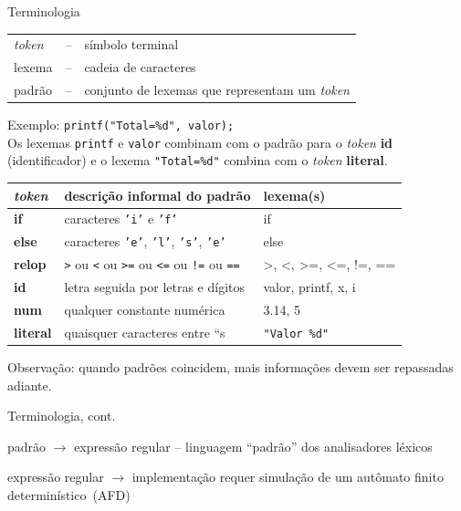 \begin{frame}{Terminologia}
  \begin{tabular}[h]{lcl}
    \alert{\it token\/}& -- & símbolo terminal\\
    lexema & -- &cadeia de caracteres \\
    padrão & -- &conjunto de lexemas que representam um {\it token\/}
  \end{tabular}\bigskip

  \pause\small
  Exemplo: {\tt printf("Total=\%d", valor);}\\
  Os lexemas {\tt printf} e {\tt valor} combinam com o padrão para
  o {\it token\/} {\bf id} (identificador) e o lexema {\tt "Total=\%d"}
  combina com o {\it token\/} {\bf literal}.\\

  \pause\bigskip
  \begingroup
  \footnotesize\center
  \begin{tabular}[h]{lll}\toprule
    {\sc\it token\/}& \sc descrição informal do padrão & \sc lexema(s)\\
    \midrule
    {\bf if} & caracteres {\tt 'i'} e {\tt 'f'} & if \\
    {\bf else} & caracteres {\tt 'e'}, {\tt 'l'}, {\tt 's'}, {\tt 'e'}  & else \\
    {\bf relop} & {\tt >} ou {\tt <} ou {\tt >=} ou {\tt <=} ou {\tt !=}
                  ou {\tt ==} & >, <, >=, <=, !=, == \\
    {\bf id} & letra seguida por letras e dígitos & valor, printf, x, i \\
    {\bf num} & qualquer constante numérica & 3.14, 5 \\
    {\bf literal} & quaisquer caracteres entre ``s & {\tt "Valor \%d"} \\
    \bottomrule
  \end{tabular}
  \endgroup
  \bigskip

    \scriptsize
    Observação: quando padrões coincidem, mais informações devem
    ser repassadas adiante.
\end{frame}


\begin{frame}{Terminologia, cont.}

  \hfil padrão $\rightarrow$ \alert{expressão regular} --
  linguagem ``padrão'' dos analisadores léxicos\\\bigskip

  expressão regular $\rightarrow$ implementação requer simulação de um
  \alert{autômato finito determinístico}~(AFD)

\end{frame}

